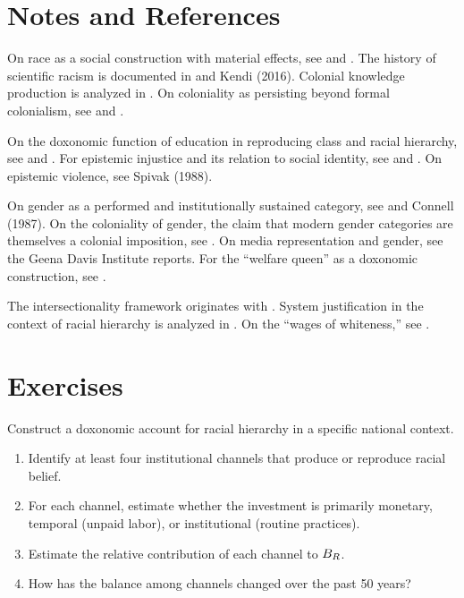 \section{Notes and References}
\label{sec:ch24b-notes}

On race as a social construction with material effects, see \textcite{dubois1903} and \textcite{fanon1961}.
The history of scientific racism is documented in \textcite{gould1981} and Kendi (2016).
Colonial knowledge production is analyzed in \textcite{said1978}.
On coloniality as persisting beyond formal colonialism, see \textcite{quijano2000} and \textcite{mignolo2011}.

On the doxonomic function of education in reproducing class and racial hierarchy, see \textcite{bowles1976} and \textcite{bourdieu1984}.
For epistemic injustice and its relation to social identity, see \textcite{fricker2007} and \textcite{medina2013}.
On epistemic violence, see Spivak (1988).

On gender as a performed and institutionally sustained category, see \textcite{butler1990} and Connell (1987).
On the coloniality of gender, the claim that modern gender categories are themselves a colonial imposition, see \textcite{lugones2010}.
On media representation and gender, see the Geena Davis Institute reports.
For the ``welfare queen'' as a doxonomic construction, see \textcite{gilens1999}.

The intersectionality framework originates with \textcite{crenshaw1989}.
System justification in the context of racial hierarchy is analyzed in \textcite{jost2004}.
On the ``wages of whiteness,'' see \textcite{du-bois2007}.

\section{Exercises}

\begin{exercise}
Construct a doxonomic account for racial hierarchy in a specific national context.
\begin{enumerate}[nosep]
  \item Identify at least four institutional channels that produce or reproduce racial belief.
  \item For each channel, estimate whether the investment is primarily monetary, temporal (unpaid labor), or institutional (routine practices).
  \item Estimate the relative contribution of each channel to $B_{R}$.
  \item How has the balance among channels changed over the past 50 years?
\end{enumerate}
\end{exercise}

